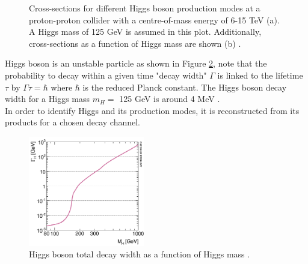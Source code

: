 \begin{figure}[htbp]
    \centering
    \caption{Cross-sections for different Higgs boson production modes at a proton-proton collider with a centre-of-mass energy of 6-15 TeV (a). A Higgs mass of 125 GeV is assumed in this plot. Additionally, cross-sections as a function of Higgs mass are shown (b) \cite{LHCHXSWG_Twiki}.}
    \label{fig:chap1:EWSB:HXSEC}
\end{figure}
Higgs boson is an unstable particle as shown in Figure \ref{fig:chap1:EWSB:D}, note that the probability to decay within a given time "decay width" $\Gamma$ is linked to the lifetime $\tau$ by $ \Gamma\tau = \hbar$ where $\hbar$ is the reduced Planck constant. The Higgs boson decay width for a Higgs mass $m_{H} = $ 125 GeV is around 4 MeV \cite{CMS_HiggsWidth}.\\
In order to identify Higgs and its production modes, it is reconstructed from its products for a chosen decay channel. 
\begin{figure}[htbp]
    \centering
    \includegraphics[width=0.45\textwidth]{Ch1/Img/Higgs_decay.png}
    \caption{Higgs boson total decay width as a function of Higgs mass \cite{HiggsWidth}.}
    \label{fig:chap1:EWSB:D}
\end{figure}

